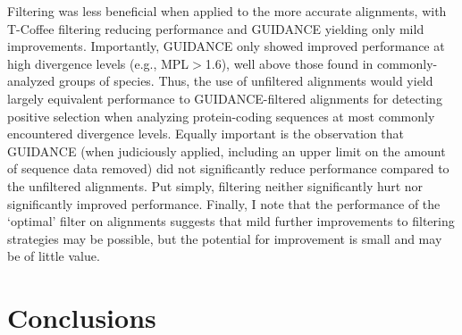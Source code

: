 
Filtering was less beneficial when applied to the more accurate
\prankc alignments, with T-Coffee filtering reducing performance and
GUIDANCE yielding only mild \tpr improvements. Importantly, GUIDANCE
only showed improved performance at high divergence levels (e.g.,
MPL$>$1.6), well above those found in commonly-analyzed groups of
species. Thus, the use of unfiltered \prankc alignments would yield
largely equivalent performance to GUIDANCE-filtered alignments for
detecting \sw positive selection when analyzing protein-coding
sequences at most commonly encountered divergence levels. Equally
important is the observation that GUIDANCE (when judiciously applied,
including an upper limit on the amount of sequence data removed) did
not significantly reduce performance compared to the unfiltered
alignments. Put simply, filtering neither significantly hurt nor
significantly improved performance. Finally, I note that the
performance of the `optimal' filter on \prankc alignments suggests
that mild further improvements to filtering strategies may be
possible, but the potential for improvement is small and may be of
little value.

\section{Conclusions}

